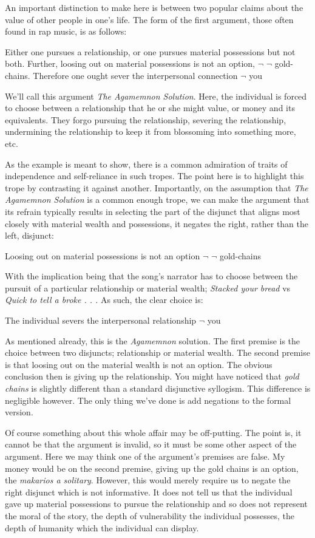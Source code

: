 \documentclass[phdthesis,12pt,final,a4paper]{wuthesis}
\theoremstyle{definition}
\theoremstyle{definition}
\theoremstyle{definition}
\theoremstyle{definition}
\theoremstyle{remark}
\begin{document}
An important distinction to make here is between two popular claims about the value of other people in one's life. The form of the first argument, those often found in rap music, is as follows:

Either one pursues a relationship, or one pursues material possessions but not both. Further, loosing out on material possessions is not an option, \(\lnot\) \(\lnot\) gold-chains. Therefore one ought sever the interpersonal connection \(\lnot\) you

We'll call this argument \emph{The Agamemnon Solution}. Here, the individual is forced to choose between a relationship that he or she might value, or money and its equivalents. They forgo pursuing the relationship, severing the relationship, undermining the relationship to keep it from blossoming into something more, etc.

As the example is meant to show, there is a common admiration of traits of independence and self-reliance in such tropes. The point here is to highlight this trope by contrasting it against another. Importantly, on the assumption that \emph{The Agamemnon Solution} is a common enough trope, we can make the argument that its refrain typically results in selecting the part of the disjunct that aligns most closely with material wealth and possessions, it negates the right, rather than the left, disjunct:

Loosing out on material possessions is not an option \(\lnot\) \(\lnot\) gold-chains

With the implication being that the song's narrator has to choose between the pursuit of a particular relationship or material wealth; \emph{Stacked your bread} vs \emph{Quick to tell a broke . . .} As such, the clear choice is:

The individual severs the interpersonal relationship \(\lnot\) you

As mentioned already, this is the \emph{Agamemnon} solution. The first premise is the choice between two disjuncts; relationship or material wealth. The second premise is that loosing out on the material wealth is not an option. The obvious conclusion then is giving up the relationship. You might have noticed that \emph{gold chains} is slightly different than a standard disjunctive syllogism. This difference is negligible however. The only thing we've done is add negations to the formal version.

Of course something about this whole affair may be off-putting. The point is, it cannot be that the argument is invalid, so it must be some other aspect of the argument. Here we may think one of the argument's premises are false. My money would be on the second premise, giving up the gold chains is an option, the \emph{makarios a solitary}. However, this would merely require us to negate the right disjunct which is not informative. It does not tell us that the individual gave up material possessions to pursue the relationship and so does not represent the moral of the story, the depth of vulnerability the individual possesses, the depth of humanity which the individual can display.
\end{document}
